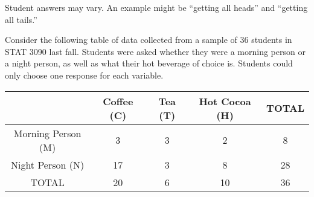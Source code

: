 \documentclass[noanswers]{exam}
\begin{document}
\begin{questions}
\begin{parts}
	\begin{solution}[\stretch{1}]
	\vspace{3mm}
	Student answers may vary. An example might be ``getting all heads'' and ``getting all tails.''
	\vspace{3mm}	
	\end{solution}
		
	\end{parts}
		
%	
%
%
%	
%	

\newpage

\question Consider the following table of data collected from a sample of 36 students in STAT 3090 last fall. Students were asked whether they were a morning person or a night person, as well as what their hot beverage of choice is. Students could only choose one response for each variable.
	
	\begin{center}
\begin{tabular}{|c|c|c|c|c|}
\hline
 & \hspace{3mm} Coffee (C) \hspace{3mm} & \hspace{4mm} Tea (T) \hspace{4mm} & Hot Cocoa (H) & TOTAL\\
 \hline
 Morning Person (M) & 3 & 3 & 2 & 8 \\
 \hline
 Night Person (N) & 17 & 3 & 8 & 28 \\
\hline
TOTAL & 20 & 6 & 10 & 36 \\
\hline
\end{tabular}
\end{center}


\end{questions}
\end{document}
